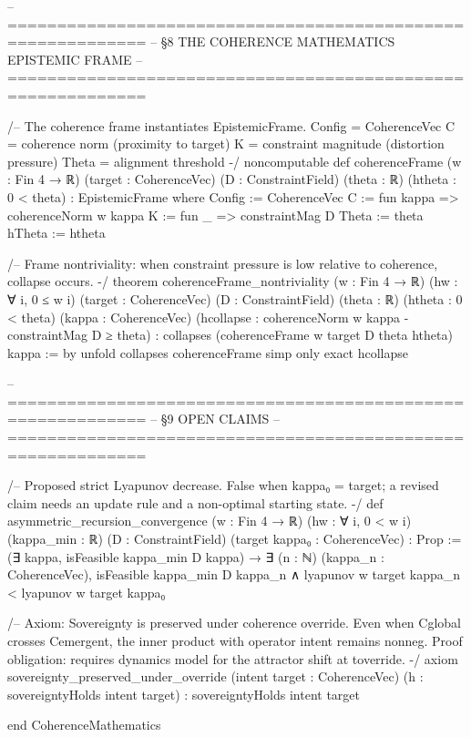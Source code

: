 -- ============================================================
-- §8  THE COHERENCE MATHEMATICS EPISTEMIC FRAME
-- ============================================================

/-- The coherence frame instantiates EpistemicFrame.
    Config  = CoherenceVec
    C       = coherence norm (proximity to target)
    K       = constraint magnitude (distortion pressure)
    Theta   = alignment threshold -/
noncomputable def coherenceFrame (w : Fin 4 → ℝ)
    (target : CoherenceVec) (D : ConstraintField)
    (theta : ℝ) (htheta : 0 < theta) : EpistemicFrame where
  Config := CoherenceVec
  C      := fun kappa => coherenceNorm w kappa
  K      := fun _ => constraintMag D
  Theta  := theta
  hTheta := htheta

/-- Frame nontriviality: when constraint pressure is low
    relative to coherence, collapse occurs. -/
theorem coherenceFrame_nontriviality (w : Fin 4 → ℝ)
    (hw : ∀ i, 0 ≤ w i)
    (target : CoherenceVec) (D : ConstraintField)
    (theta : ℝ) (htheta : 0 < theta)
    (kappa : CoherenceVec)
    (hcollapse : coherenceNorm w kappa - constraintMag D ≥ theta) :
    collapses (coherenceFrame w target D theta htheta) kappa := by
  unfold collapses coherenceFrame
  simp only
  exact hcollapse

-- ============================================================
-- §9  OPEN CLAIMS
-- ============================================================

/-- Proposed strict Lyapunov decrease. False when kappa₀ = target;
    a revised claim needs an update rule and a non-optimal starting state. -/
def asymmetric_recursion_convergence
    (w : Fin 4 → ℝ) (hw : ∀ i, 0 < w i)
    (kappa_min : ℝ) (D : ConstraintField)
    (target kappa₀ : CoherenceVec) : Prop :=
    (∃ kappa, isFeasible kappa_min D kappa) →
    ∃ (n : ℕ) (kappa_n : CoherenceVec),
      isFeasible kappa_min D kappa_n ∧
      lyapunov w target kappa_n < lyapunov w target kappa₀

/-- Axiom: Sovereignty is preserved under coherence override.
    Even when Cglobal crosses Cemergent, the inner product
    with operator intent remains nonneg.
    Proof obligation: requires dynamics model for the
    attractor shift at toverride. -/
axiom sovereignty_preserved_under_override
    (intent target : CoherenceVec)
    (h : sovereigntyHolds intent target) :
    sovereigntyHolds intent target

end CoherenceMathematics
